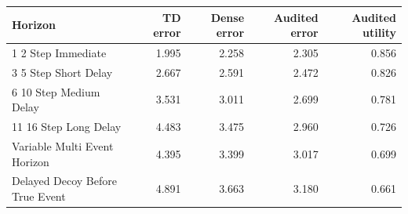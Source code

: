 \begin{tabular}{lrrrr}
\toprule
Horizon & TD error & Dense error & Audited error & Audited utility \\
\midrule
1 2 Step Immediate & 1.995 & 2.258 & 2.305 & 0.856 \\
3 5 Step Short Delay & 2.667 & 2.591 & 2.472 & 0.826 \\
6 10 Step Medium Delay & 3.531 & 3.011 & 2.699 & 0.781 \\
11 16 Step Long Delay & 4.483 & 3.475 & 2.960 & 0.726 \\
Variable Multi Event Horizon & 4.395 & 3.399 & 3.017 & 0.699 \\
Delayed Decoy Before True Event & 4.891 & 3.663 & 3.180 & 0.661 \\
\bottomrule
\end{tabular}

